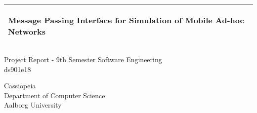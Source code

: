 %
\begin{titlepage}
  \addtolength{\hoffset}{0.5\evensidemargin-0.5\oddsidemargin} %
  \noindent%
  \begin{tabular}{@{}p{\textwidth}@{}}
    \toprule[2pt]
    \midrule
    \vspace{0.2cm}
    \begin{center}
    \Huge{\textbf{
      Message Passing Interface for Simulation of Mobile Ad-hoc Networks%
    }}
    \end{center}
    \vspace{0.2cm}\\
    \midrule
    \toprule[2pt]
  \end{tabular}
  \vspace{4 cm}
  \begin{center}
    {\large
      Project Report - 9th Semester Software Engineering %
    }\\
    \vspace{0.2cm}
    {\Large
    ds901e18%
    }
  \end{center}
  \vfill
  \begin{center}
  Cassiopeia\\
  Department of Computer Science\\
  Aalborg University
  \end{center}
\end{titlepage}
\clearpage
